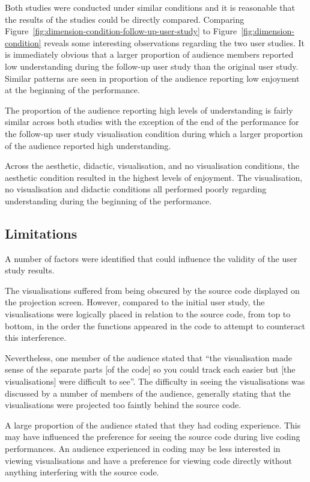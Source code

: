 Both studies were conducted under similar conditions and it is reasonable that the results of the studies could be directly compared. Comparing Figure~\ref{fig:dimension-condition-follow-up-user-study} to Figure~\ref{fig:dimension-condition} reveals some interesting observations regarding the two user studies. It is immediately obvious that a larger proportion of audience members reported low understanding during the follow-up user study than the original user study. Similar patterns are seen in proportion of the audience reporting low enjoyment at the beginning of the performance.

The proportion of the audience reporting high levels of understanding is fairly similar across both studies with the exception of the end of the performance for the follow-up user study visualisation condition during which a larger proportion of the audience reported high understanding.

Across the aesthetic, didactic, visualisation, and no visualisation conditions, the aesthetic condition resulted in the highest levels of enjoyment. The visualisation, no visualisation and didactic conditions all performed poorly regarding understanding during the beginning of the performance.

\subsection{Limitations}

A number of factors were identified that could influence the validity of the user study results.

The visualisations suffered from being obscured by the source code displayed on the projection screen. However, compared to the initial user study, the visualisations were logically placed in relation to the source code, from top to bottom, in the order the functions appeared in the code to attempt to counteract this interference.

Nevertheless, one member of the audience stated that ``the visualisation made sense of the separate parts [of the code] so you could track each easier but [the visualisations] were difficult to see''. The difficulty in seeing the visualisations was discussed by a number of members of the audience, generally stating that the visualisations were projected too faintly behind the source code.

A large proportion of the audience stated that they had coding experience. This may have influenced the preference for seeing the source code during live coding performances. An audience experienced in coding may be less interested in viewing visualisations and have a preference for viewing code directly without anything interfering with the source code.

